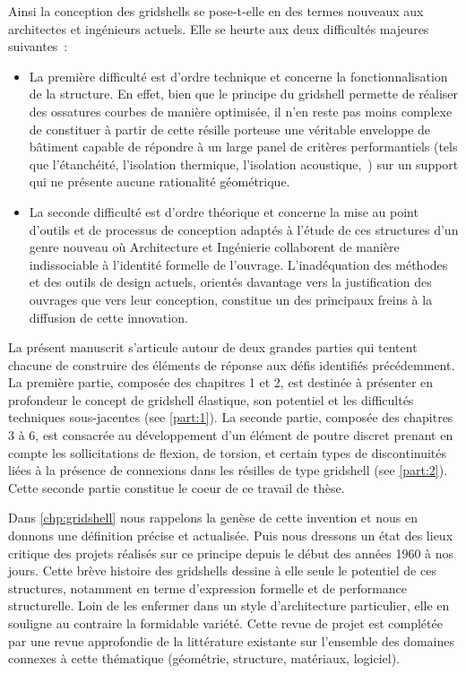 Ainsi la conception des gridshells se pose-t-elle en des termes nouveaux aux architectes et ingénieurs actuels. Elle se heurte aux deux difficultés majeures suivantes~:
\begin{itemize}
\item
La première difficulté est d'ordre technique et concerne la fonctionnalisation de la structure. En effet, bien que le principe du gridshell permette de réaliser des ossatures courbes de manière optimisée, il n'en reste pas moins complexe de constituer à partir de cette résille porteuse une véritable enveloppe de bâtiment capable de répondre à un large panel de critères performantiels (tels que l'étanchéité, l'isolation thermique, l'isolation acoustique,~\telp{}) sur un support qui ne présente aucune rationalité géométrique. 
\item
La seconde difficulté est d'ordre théorique et concerne la mise au point d'outils et de processus de conception adaptés à l'étude de ces structures d'un genre nouveau où Architecture et Ingénierie collaborent de manière indissociable à l'identité formelle de l'ouvrage. L'inadéquation des méthodes et des outils de design actuels, orientés davantage vers la justification des ouvrages que vers leur conception, constitue un des principaux freins à la diffusion de cette innovation.
\end{itemize}

La présent manuscrit s'articule autour de deux grandes parties qui tentent chacune de construire des éléments de réponse aux défis identifiés précédemment. La première partie, composée des chapitres 1 et 2, est destinée à présenter en profondeur le concept de gridshell élastique, son potentiel et les difficultés techniques sous-jacentes (see \cref{part:1}). La seconde partie, composée des chapitres 3 à 6, est consacrée au développement d'un élément de poutre discret prenant en compte les sollicitations de flexion, de torsion, et certain types de discontinuités liées à la présence de connexions dans les résilles de type gridshell (see \cref{part:2}). Cette seconde partie constitue le coeur  de ce travail de thèse. 

Dans \cref{chp:gridshell} nous rappelons la genèse de cette invention et nous en donnons une définition précise et actualisée. Puis nous dressons un état des lieux critique des projets réalisés sur ce principe depuis le début des années 1960 à nos jours. Cette brève histoire des gridshells dessine à elle seule le potentiel de ces structures, notamment en terme d'expression formelle et de performance structurelle. Loin de les enfermer dans un style d'architecture particulier, elle en souligne au contraire la formidable variété. Cette revue de projet est complétée par une revue approfondie de la littérature existante sur l'ensemble des domaines connexes à cette thématique (géométrie, structure, matériaux, logiciel).

